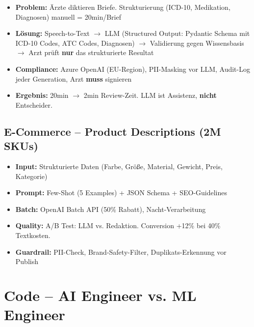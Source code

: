 \begin{itemize}[leftmargin=*]
    \item \textbf{Problem:} Ärzte diktieren Briefe. Strukturierung (ICD-10, Medikation, Diagnosen) manuell = 20min/Brief
    \item \textbf{Lösung:} Speech-to-Text $\to$ LLM (Structured Output: Pydantic Schema mit ICD-10 Codes, ATC Codes, Diagnosen) $\to$ Validierung gegen Wissensbasis $\to$ Arzt prüft \textbf{nur} das strukturierte Resultat
    \item \textbf{Compliance:} Azure OpenAI (EU-Region), PII-Masking vor LLM, Audit-Log jeder Generation, Arzt \textbf{muss} signieren
    \item \textbf{Ergebnis:} 20min $\to$ 2min Review-Zeit. LLM ist Assistenz, \textbf{nicht} Entscheider.
\end{itemize}


\subsection{E-Commerce -- Product Descriptions (2M SKUs)}

\begin{itemize}[leftmargin=*]
    \item \textbf{Input:} Strukturierte Daten (Farbe, Größe, Material, Gewicht, Preis, Kategorie)
    \item \textbf{Prompt:} Few-Shot (5 Examples) + JSON Schema + SEO-Guidelines
    \item \textbf{Batch:} OpenAI Batch API (50\% Rabatt), Nacht-Verarbeitung
    \item \textbf{Quality:} A/B Test: LLM vs. Redaktion. Conversion +12\% bei 40\% Textkosten.
    \item \textbf{Guardrail:} PII-Check, Brand-Safety-Filter, Duplikats-Erkennung vor Publish
\end{itemize}

\section{Code -- AI Engineer vs. ML Engineer}

